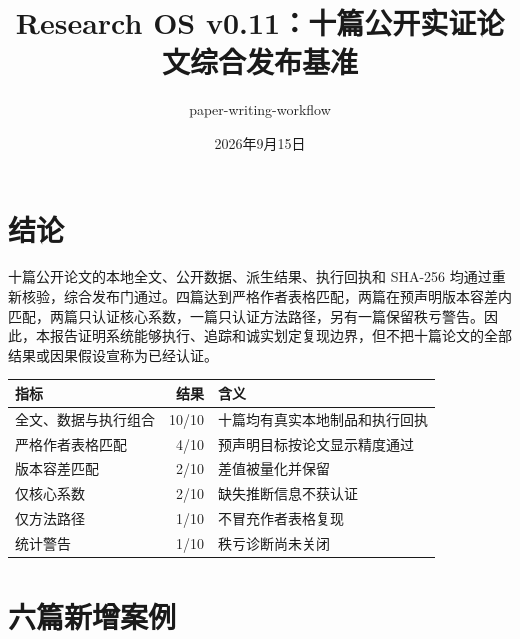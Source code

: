 \documentclass[UTF8,11pt]{ctexart}
\title{Research OS v0.11：十篇公开实证论文综合发布基准}
\author{paper-writing-workflow}
\date{2026年9月15日}
\begin{document}
\maketitle

\section{结论}

十篇公开论文的本地全文、公开数据、派生结果、执行回执和 SHA-256 均通过重新核验，综合发布门通过。四篇达到严格作者表格匹配，两篇在预声明版本容差内匹配，两篇只认证核心系数，一篇只认证方法路径，另有一篇保留秩亏警告。因此，本报告证明系统能够执行、追踪和诚实划定复现边界，但不把十篇论文的全部结果或因果假设宣称为已经认证。

\begin{table}[htbp]
\centering
\begin{tabular}{p{5.3cm}rp{6.5cm}}
\toprule
指标 & 结果 & 含义 \\
\midrule
全文、数据与执行组合 & 10/10 & 十篇均有真实本地制品和执行回执 \\
严格作者表格匹配 & 4/10 & 预声明目标按论文显示精度通过 \\
版本容差匹配 & 2/10 & 差值被量化并保留 \\
仅核心系数 & 2/10 & 缺失推断信息不获认证 \\
仅方法路径 & 1/10 & 不冒充作者表格复现 \\
统计警告 & 1/10 & 秩亏诊断尚未关闭 \\
\bottomrule
\end{tabular}
\end{table}

\section{六篇新增案例}
\end{document}
